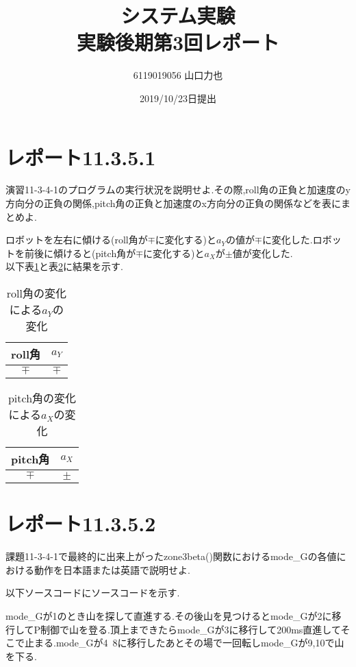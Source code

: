 \documentclass{jarticle}
\title{{システム実験}\\実験後期第3回レポート}
\author{6119019056 山口力也}
\date{2019/10/23日提出}
\begin{document}
\maketitle
\section{レポート11.3.5.1}
演習11-3-4-1のプログラムの実行状況を説明せよ.その際,roll角の正負と加速度のy方向分の正負の関係,pitch角の正負と加速度のx方向分の正負の関係などを表にまとめよ.

ロボットを左右に傾ける(roll角が$\mp$に変化する)と$a_Y$の値が$\mp$に変化した.ロボットを前後に傾けると(pitch角が$\mp$に変化する)と$a_X$が$\pm$値が変化した. \\
以下表\ref{tb:roll}と表\ref{tb:pitch}に結果を示す.
\begin{table}[H]
\begin{center}
\caption{roll角の変化による$a_Y$の変化}
\label{tb:roll}
    \begin{tabular}{|c|c|} \hline
    roll角 & $a_Y$  \\ \hline 
    $\mp$ & $\mp$ \\ \hline 
    \end{tabular}
\end{center}
\end{table}

\begin{table}[H]
\begin{center}
\caption{pitch角の変化による$a_X$の変化}
\label{tb:pitch}
    \begin{tabular}{|c|c|} \hline 
    pitch角 & $a_X$ \\ \hline 
    $\mp$ & $\pm$ \\ \hline 
    \end{tabular}
\end{center}
\end{table}

\section{レポート11.3.5.2}

課題11-3-4-1で最終的に出来上がったzone3beta()関数におけるmode\_Gの各値における動作を日本語または英語で説明せよ.

以下ソースコードにソースコードを示す.



mode\_Gが1のとき山を探して直進する.その後山を見つけるとmode\_Gが2に移行してP制御で山を登る.頂上まできたらmode\_Gが3に移行して200ms直進してそこで止まる.mode\_Gが4~8に移行したあとその場で一回転しmode\_Gが9,10で山を下る.
\end{document}
